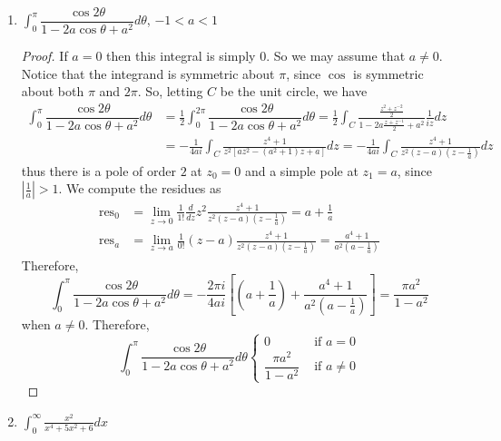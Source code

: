 \documentclass[10pt]{article}
\newcommand{\Int}{\displaystyle\int}
\DeclareMathOperator*{\res}{res}
\begin{document}
\begin{enumerate}
\item $\Int_0^\pi \dfrac{\cos 2\theta}{1 - 2a \cos\theta + a^2} d\theta$, \hspace{.5cm}  $-1 < a < 1$

\begin{proof}
If $a=0$ then this integral is simply 0.  So we may assume that $a \neq 0$.  Notice that the integrand is symmetric about $\pi$, since $\cos$ is symmetric about both $\pi$ and $2\pi$.  So, letting $C$ be the unit circle, we have
\begin{align*}
\Int_0^\pi \dfrac{\cos 2\theta}{1 - 2a \cos\theta + a^2} d\theta
&= \frac{1}{2} \Int_0^{2\pi} \dfrac{\cos 2\theta}{1 - 2a \cos\theta + a^2} d\theta
= \frac{1}{2} \int_C \frac{\frac{z^2 + z^{-2}}{2}}{1 - 2a\frac{z + z^{-1}}{2} + a^2} \frac{1}{iz} dz
\\
&= -\frac{1}{4ai} \int_C \frac{z^4 + 1}{z^2[az^2 - (a^2+1)z + a]} dz = -\frac{1}{4ai} \int_C \frac{z^4 + 1}{z^2(z-a)(z-\frac1a)} dz
\end{align*}
thus there is a pole of order $2$ at $z_0 = 0$ and a simple pole at $z_1 = a$, since $|\frac{1}{a}| > 1$.  We compute the residues as
\begin{align*}
\res\nolimits_{0} &= \lim_{z \rightarrow 0 } \frac{1}{1!}\frac{d}{dz} z^2 \frac{z^4 + 1}{z^2(z-a)(z-\frac{1}{a})}
=
a + \frac1a
\\
\res\nolimits_{a} &= \lim_{z \rightarrow a} \frac{1}{0!} (z-a)\frac{z^4 + 1}{z^2(z-a)(z-\frac{1}{a})} = \frac{a^4 + 1}{a^2(a-\frac1a)}
\end{align*}
Therefore,
$$
\Int_0^\pi \dfrac{\cos 2\theta}{1 - 2a \cos\theta + a^2} d\theta
=
-\frac{2\pi i}{4ai} \left[\left(a + \frac1a \right) + \frac{a^4 + 1}{a^2(a-\frac1a)} \right]
=
 \dfrac{\pi a^2}{1-a^2}
$$
when $a \neq 0$.  Therefore,
$$
\boxed{
\Int_0^\pi \dfrac{\cos 2\theta}{1 - 2a \cos\theta + a^2} d\theta
\begin{cases}
0 & \text{ if } a = 0 \\
 \dfrac{\pi a^2}{1-a^2} & \text{ if } a \neq 0
\end{cases}
}
$$
\end{proof}

\item $\Int_0^\infty \frac{x^2}{x^4 + 5x^2 + 6} dx$


\end{enumerate}
\end{document}
